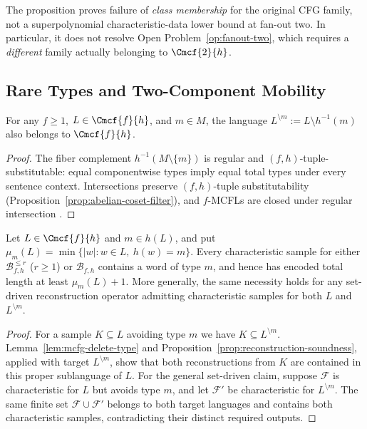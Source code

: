 \begin{remark}
The proposition proves failure of \emph{class membership}
for the original CFG family, not a superpolynomial
characteristic-data lower bound at fan-out two.
In particular, it does not resolve
Open Problem~\ref{op:fanout-two}, which requires a
\emph{different} family actually belonging to
$\Cmcf{2}{h}$.
\end{remark}



\subsection{Rare Types and Two-Component Mobility}
\label{subsec:rare-type-mobility}

\begin{lemma}
\label{lem:mcfg-delete-type}
For any $f\ge1$, $L\in\Cmcf{f}{h}$, and $m\in M$,
the language $L^{\setminus m}:=L\setminus h^{-1}(m)$
also belongs to $\Cmcf{f}{h}$.
\end{lemma}
\begin{proof}
The fiber complement $h^{-1}(M\setminus\{m\})$ is
regular and $(f,h)$-tuple-substitutable: equal componentwise
types imply equal total types under every sentence context.
Intersections preserve $(f,h)$-tuple substitutability
(Proposition~\ref{prop:abelian-coset-filter}),
and $f$-MCFLs are closed under regular intersection
\cite{SekiEtAl1991}.
\end{proof}

\begin{proposition}
\label{prop:mcfg-rare-type-sample}
Let $L\in\Cmcf{f}{h}$ and $m\in h(L)$, and put
$\mu_m(L)=\min\{|w|:w\in L,\ h(w)=m\}$.
Every characteristic sample for either
$\mathcal B^{\le r}_{f,h}$ ($r\ge1$) or
$\mathcal B_{f,h}$ contains a word of type $m$, and hence has
encoded total length at least $\mu_m(L)+1$.
More generally, the same necessity holds for any set-driven
reconstruction operator admitting characteristic samples for
both $L$ and $L^{\setminus m}$.
\end{proposition}
\begin{proof}
For a sample $K\subseteq L$ avoiding type $m$ we have
$K\subseteq L^{\setminus m}$.
Lemma~\ref{lem:mcfg-delete-type} and
Proposition~\ref{prop:reconstruction-soundness}, applied
with target $L^{\setminus m}$, show that both reconstructions
from $K$ are contained in this proper sublanguage of $L$.
For the general set-driven claim, suppose $\mathcal F$ is
characteristic for $L$ but avoids type $m$, and let
$\mathcal F'$ be characteristic for $L^{\setminus m}$.
The same finite set $\mathcal F\cup\mathcal F'$ belongs to
both target languages and contains both characteristic
samples, contradicting their distinct required outputs.
\end{proof}


